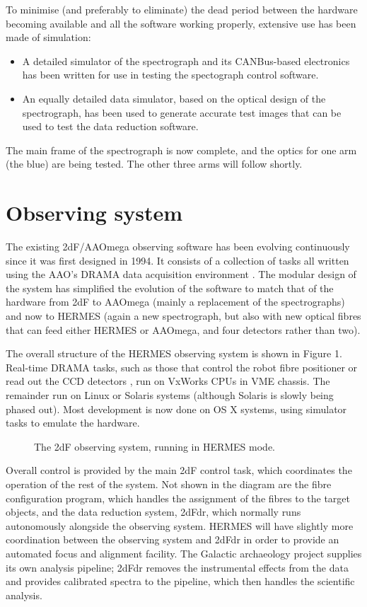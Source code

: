 \documentclass[11pt,twoside]{article}
\begin{document}
To minimise (and preferably to eliminate) the dead period between the hardware becoming available and all the software working properly, extensive use has been made of simulation:

\begin{itemize}
\itemsep0em
\item A detailed simulator of the spectrograph and its CANBus-based electronics has been written for use in testing the spectograph control software.
\item An equally detailed data simulator, based on the optical design of the spectrograph, has been used to generate accurate test images that can be used to  test the data reduction software.
\end{itemize}

The main frame of the spectrograph is now complete, and the optics for one arm (the blue) are being tested. The other three arms will follow shortly.

\section{Observing system}

The existing 2dF/AAOmega observing software has been evolving continuously since it was first designed in 1994. It consists of a collection of tasks all written using the AAO's DRAMA data acquisition environment \citep{Drama_1995}. The modular design of the system has simplified the evolution of the software to match that of the hardware from 2dF to AAOmega (mainly a replacement of the spectrographs) and now to HERMES (again a new spectrograph, but also with new optical fibres that can feed either HERMES or AAOmega, and four detectors rather than two).

The overall structure of the HERMES observing system is shown in Figure 1. Real-time DRAMA tasks, such as those that control the robot fibre positioner or read out the CCD detectors \citep{AAO2_2004},  run on VxWorks CPUs in VME chassis. The remainder run on Linux or Solaris systems (although Solaris is slowly being phased out). Most development is now done on OS X systems, using simulator tasks to emulate the hardware.

\begin{figure}
\caption{The 2dF observing system, running in HERMES mode.}
\end{figure}

Overall control is provided by the main 2dF control task, which coordinates the operation of the rest of the system. Not shown in the diagram are the fibre configuration program, which handles the assignment of the fibres to the target objects, and the data reduction system, 2dFdr, which normally runs autonomously alongside the observing system. HERMES will have slightly more coordination between the observing system and 2dFdr in order to provide an automated focus and alignment facility. The Galactic archaeology project supplies its own analysis pipeline; 2dFdr removes the instrumental effects from the data and provides calibrated spectra to the pipeline, which then handles the scientific analysis.
\end{document}
